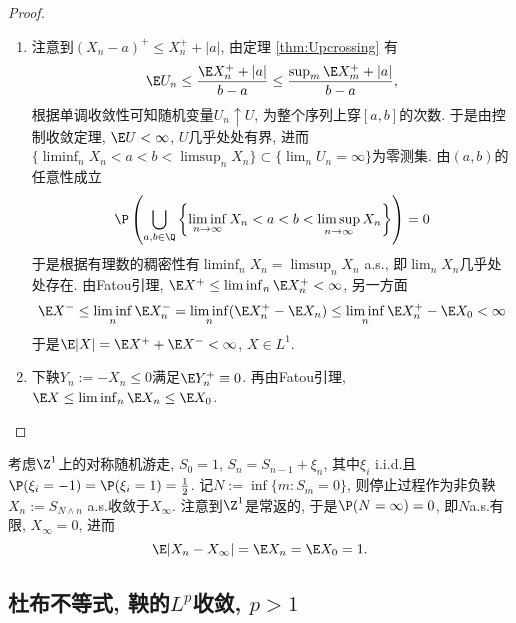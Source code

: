 \documentclass[a4paper, 10pt]{ctexart}
\begin{document}
\begin{proof} 
\begin{enumerate}
	\item 
	注意到$(X_n - a)^+ \leq X_n^+ + |a|$, 由定理 \ref{thm:Upcrossing} 有
	\begin{equation*}
		\E U_n \leq \frac{\E X_n^+ + |a|}{b-a} \leq \frac{\sup_m \E X_m^+ + |a|}{b-a}, 
	\end{equation*} 
	根据单调收敛性可知随机变量$U_n \uparrow U$, 为整个序列上穿$[a,b]$的次数. 
	于是由控制收敛定理, $\E U < \infty$, $U$几乎处处有界, 进而$\{\liminf_n X_n < a < b < \limsup_n X_n\} \subset \{\lim_n U_n = \infty\}$为零测集. 
	由$(a,b)$的任意性成立
	\begin{equation*}
		\P \left( \bigcup_{a,b \in \Q} \left\{ \liminf_{n \to \infty} X_n < a < b < \limsup_{n \to \infty} X_n \right\} \right) = 0
	\end{equation*}
	于是根据有理数的稠密性有$\liminf_n X_n = \limsup_n X_n$ a.s., 即$\lim_n X_n$几乎处处存在. 
	由Fatou引理, $\E X^+ \leq \liminf_n \E X_n^+ < \infty$, 另一方面
	\begin{equation*}
		\E X^- 
		\leq \liminf_n \E X_n^- 
		= \liminf_n (\E X_n^+ - \E X_n) 
		\leq \liminf_n \E X_n ^+ - \E X_0 < \infty
	\end{equation*}
	于是$\E|X| = \E X^+ + \E X^- < \infty$, $X \in L^1$. 
	\item 
	下鞅$Y_n := - X_n \leq 0$满足$\E Y_n^+ \equiv 0$. 
	再由Fatou引理, $\E X \leq \liminf_n \E X_n \leq \E X_0$. 
\end{enumerate}
\end{proof}

\begin{example} \label{example:a.s.ButNotL1}
	考虑$\Z^1$上的对称随机游走, $S_0 = 1$, $S_n = S_{n-1} + \xi_n$, 其中$\xi_i$ i.i.d.且$\P(\xi_i = -1) = \P(\xi_i = 1) = \frac12$. 
	记$N:= \inf\{m \colon S_m = 0\}$, 则停止过程作为非负鞅$X_n:= S_{N \wedge n}$ a.s.收敛于$X_{\infty}$. 
	注意到$\Z^1$是常返的, 于是$\P(N = \infty) = 0$, 即$N$a.s.有限, $X_\infty = 0$, 进而
	\begin{equation*}
		\E|X_n - X_\infty| = \E X_n = \E X_0 = 1. 
	\end{equation*}
\end{example}

\subsection{杜布不等式, 鞅的$L^p$收敛, $p >1$}
\end{document}
